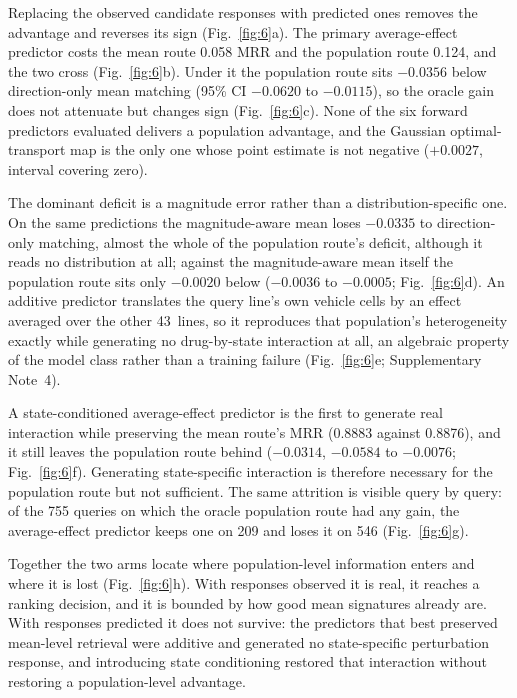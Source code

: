 \documentclass[11pt,letterpaper]{article}
\newcommand{\NFITCTX}{43}               %
\begin{document}
Replacing the observed candidate responses with predicted ones removes the advantage and reverses its sign (Fig.~\ref{fig:6}a). The primary average-effect predictor costs the mean route 0.058 MRR and the population route 0.124, and the two cross (Fig.~\ref{fig:6}b). Under it the population route sits $-0.0356$ below direction-only mean matching (95\% CI $-0.0620$ to $-0.0115$), so the oracle gain does not attenuate but changes sign (Fig.~\ref{fig:6}c). None of the six forward predictors evaluated delivers a population advantage, and the Gaussian optimal-transport map is the only one whose point estimate is not negative ($+0.0027$, interval covering zero).

The dominant deficit is a magnitude error rather than a distribution-specific one. On the same predictions the magnitude-aware mean loses $-0.0335$ to direction-only matching, almost the whole of the population route's deficit, although it reads no distribution at all; against the magnitude-aware mean itself the population route sits only $-0.0020$ below ($-0.0036$ to $-0.0005$; Fig.~\ref{fig:6}d). An additive predictor translates the query line's own vehicle cells by an effect averaged over the other \NFITCTX\ lines, so it reproduces that population's heterogeneity exactly while generating no drug-by-state interaction at all, an algebraic property of the model class rather than a training failure (Fig.~\ref{fig:6}e; Supplementary Note~4).

A state-conditioned average-effect predictor is the first to generate real interaction while preserving the mean route's MRR (0.8883 against 0.8876), and it still leaves the population route behind ($-0.0314$, $-0.0584$ to $-0.0076$; Fig.~\ref{fig:6}f). Generating state-specific interaction is therefore necessary for the population route but not sufficient. The same attrition is visible query by query: of the 755 queries on which the oracle population route had any gain, the average-effect predictor keeps one on 209 and loses it on 546 (Fig.~\ref{fig:6}g).

Together the two arms locate where population-level information enters and where it is lost (Fig.~\ref{fig:6}h). With responses observed it is real, it reaches a ranking decision, and it is bounded by how good mean signatures already are. With responses predicted it does not survive: the predictors that best preserved mean-level retrieval were additive and generated no state-specific perturbation response, and introducing state conditioning restored that interaction without restoring a population-level advantage.
\end{document}

